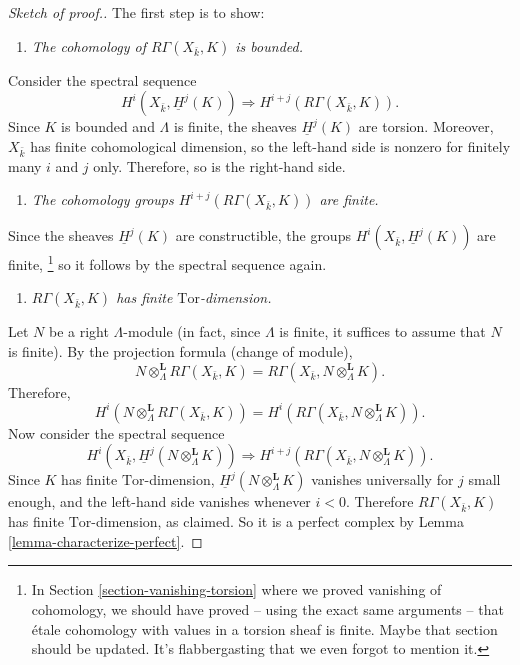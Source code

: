 \begin{proof}[Sketch of proof.]
The first step is to show:
\begin{enumerate}
\item[(1)]
{\it The cohomology of $R\Gamma(X_{\bar k}, K)$ is bounded.}
\end{enumerate}
Consider the spectral sequence
$$
H^i(X_{\bar k}, \underline H^j(K))
\Rightarrow
H^{i+j} (R\Gamma(X_{\bar k}, K)).
$$
Since $K$ is bounded and $\Lambda$ is finite, the sheaves $\underline H^j(K)$
are torsion. Moreover, $X_{\bar k}$ has finite cohomological dimension, so the
left-hand side is nonzero for finitely many $i$ and $j$ only. Therefore, so is
the right-hand side.
\begin{enumerate}
\item[(2)]
{\it The cohomology groups $H^{i+j} (R\Gamma(X_{\bar k}, K))$ are finite.}
\end{enumerate}
Since the sheaves $\underline H^j(K)$ are constructible, the groups
$H^i(X_{\bar k}, \underline H^j(K))$ are finite, \footnote{In
Section \ref{section-vanishing-torsion}
where we proved vanishing of
cohomology, we should have proved -- using the exact same arguments -- that
\'etale cohomology with values in a torsion sheaf is finite. Maybe that section
should be updated. It's flabbergasting that we even forgot to mention it.} so
it follows by the spectral sequence again.
\begin{enumerate}
\item[(3)]
{\it $R\Gamma(X_{\bar k}, K)$ has finite $\text{Tor}$-dimension.}
\end{enumerate}
Let $N$ be a right $\Lambda$-module (in fact, since $\Lambda$ is finite, it
suffices to assume that $N$ is finite). By the projection formula (change of
module),
$$
N \otimes^\mathbf{L}_\Lambda R \Gamma(X_{\bar k}, K) = R\Gamma(X_{\bar k},
N \otimes^\mathbf{L}_\Lambda K).
$$
Therefore,
$$
H^i (N \otimes^\mathbf{L}_\Lambda R\Gamma(X_{\bar k}, K)) = H^i(R\Gamma(X_{\bar
k}, N \otimes_{\Lambda}^\mathbf{L} K)).
$$
Now consider the spectral sequence
$$
H^i (X_{\bar k}, \underline H^j (N \otimes_{\Lambda}^\mathbf{L} K))
\Rightarrow
H^{i+j}(R\Gamma(X_{\bar k}, N \otimes_{\Lambda}^\mathbf{L} K)).
$$
Since $K$ has finite $\text{Tor}$-dimension, $\underline H^j
(N \otimes_{\Lambda}^\mathbf{L} K)$ vanishes universally for $j$ small enough,
and the left-hand side vanishes whenever $i < 0$. Therefore $R\Gamma(X_{\bar
k}, K)$ has finite $\text{Tor}$-dimension, as claimed. So it is a perfect
complex by Lemma \ref{lemma-characterize-perfect}.
\end{proof}





